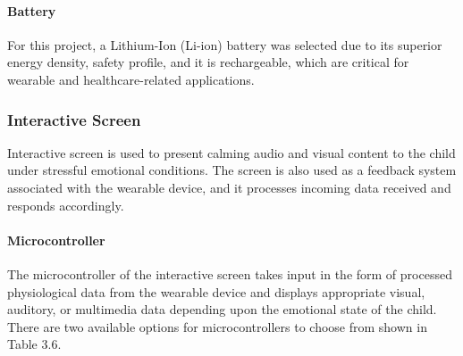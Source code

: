 \documentclass[a4paper,12pt]{report}
\begin{document}
\paragraph{Battery \\[0.3cm]}
For this project, a Lithium-Ion (Li-ion) battery was selected due to its superior energy density, safety profile, and it is rechargeable, which are critical for wearable and healthcare-related applications.
 \subsubsection{Interactive Screen}
 Interactive screen is used to present calming audio and visual content to the child under stressful emotional conditions. The screen is also used as a feedback system associated with the wearable device, and it processes incoming data received and responds accordingly. 

\paragraph{Microcontroller \\[0.3cm]} 
The microcontroller of the interactive screen takes input in the form of processed physiological data from the wearable device and displays appropriate visual, auditory, or multimedia data depending upon the emotional state of the child. 
There are two available options for microcontrollers to choose from shown in Table 3.6.

\clearpage
\renewcommand{\arraystretch}{1.8} %
\end{document}
